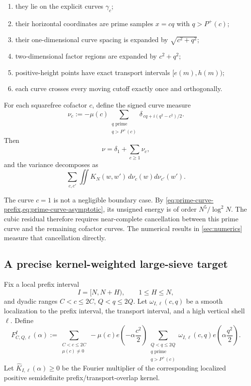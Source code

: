 \documentclass[11pt]{article}
\theoremstyle{definition}
\theoremstyle{remark}
\newcommand{\Pplus}{P^{+}}
\newcommand{\1}{\mathbf{1}}
\begin{document}
\begin{enumerate}[leftmargin=1.7em,itemsep=0.3em]
\item they lie on the explicit curves $\gamma_c$;
\item their horizontal coordinates are prime samples $x=cq$ with
      $q>\Pplus(c)$;
\item their one-dimensional curve spacing is expanded by
      $\sqrt{c^2+q^2}$;
\item two-dimensional factor regions are expanded by
      $c^2+q^2$;
\item positive-height points have exact transport intervals
      $[e(m),h(m))$;
\item each curve crosses every moving cutoff exactly once and
      orthogonally.
\end{enumerate}

For each squarefree cofactor $c$, define the signed curve measure
\begin{equation}
 \nu_c
 :=
 -\mu(c)
 \sum_{\substack{q\text{ prime}\\q>\Pplus(c)}}
 \delta_{\,cq+i(q^2-c^2)/2}.
 \label{eq:nu-c}
\end{equation}
Then
\begin{equation}
 \nu=\delta_1+\sum_{c\ge1}\nu_c,
 \label{eq:nu-curve-sum}
\end{equation}
and the variance decomposes as
\begin{equation}
 \sum_{c,c'}
 \iint K_N(w,w')\,d\nu_c(w)d\nu_{c'}(w').
 \label{eq:curve-interactions}
\end{equation}

The curve $c=1$ is not a negligible boundary case.  By
\cref{eq:prime-curve-prefix,eq:prime-curve-asymptotic}, its unsigned
energy is of order $N^5/\log^2N$.  The cubic residual therefore requires
near-complete cancellation between this prime curve and the remaining
cofactor curves.  The numerical results in \cref{sec:numerics} measure
that cancellation directly.

\subsection{A precise kernel-weighted large-sieve target}

Fix a local prefix interval
\begin{equation}
 I=[N,N+H),
 \qquad 1\le H\le N,
 \label{eq:local-prefix-I}
\end{equation}
and dyadic ranges $C<c\le2C$, $Q<q\le2Q$.  Let
$\omega_{I,\ell}(c,q)$ be a smooth localization to the prefix interval,
the transport interval, and a high vertical shell $\ell$.  Define
\begin{equation}
 F_{C,Q,\ell}^{I}(\alpha)
 :=
 \sum_{\substack{C<c\le2C\\\mu(c)\ne0}}
 -\mu(c)e\!\left(-\alpha\frac{c^2}{2}\right)
 \sum_{\substack{Q<q\le2Q\\q\text{ prime}\\q>\Pplus(c)}}
 \omega_{I,\ell}(c,q)
 e\!\left(\alpha\frac{q^2}{2}\right).
 \label{eq:F-CQ-local}
\end{equation}
Let $\widehat K_{I,\ell}(\alpha)\ge0$ be the Fourier multiplier of the
corresponding localized positive semidefinite prefix/transport-overlap
kernel.
\end{document}
